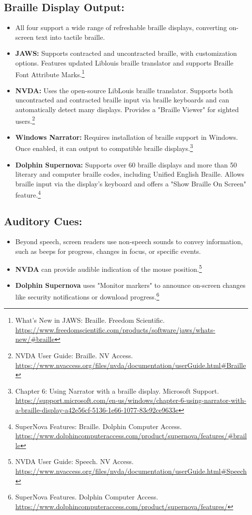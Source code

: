 \subsection*{Braille Display Output:}
\begin{itemize}[leftmargin=*,noitemsep,topsep=0pt]
    \item All four support a wide range of refreshable braille displays, converting on-screen text into tactile braille.
    \item \textbf{JAWS:} Supports contracted and uncontracted braille, with customization options. Features updated Liblouis braille translator and supports Braille Font Attribute Marks.\footnote{What's New in JAWS: Braille. Freedom Scientific. \url{https://www.freedomscientific.com/products/software/jaws/whats-new/#braille}}
    \item \textbf{NVDA:} Uses the open-source LibLouis braille translator. Supports both uncontracted and contracted braille input via braille keyboards and can automatically detect many displays. Provides a "Braille Viewer" for sighted users.\footnote{NVDA User Guide: Braille. NV Access. \url{https://www.nvaccess.org/files/nvda/documentation/userGuide.html#Braille}}
    \item \textbf{Windows Narrator:} Requires installation of braille support in Windows. Once enabled, it can output to compatible braille displays.\footnote{Chapter 6: Using Narrator with a braille display. Microsoft Support. \url{https://support.microsoft.com/en-us/windows/chapter-6-using-narrator-with-a-braille-display-a42e56cf-5136-1e66-1077-83c92ce9633e}}
    \item \textbf{Dolphin Supernova:} Supports over 60 braille displays and more than 50 literary and computer braille codes, including Unified English Braille. Allows braille input via the display's keyboard and offers a "Show Braille On Screen" feature.\footnote{SuperNova Features: Braille. Dolphin Computer Access. \url{https://www.dolphincomputeraccess.com/product/supernova/features/#braille}}
\end{itemize}

\subsection*{Auditory Cues:}
\begin{itemize}[leftmargin=*,noitemsep,topsep=0pt]
    \item Beyond speech, screen readers use non-speech sounds to convey information, such as beeps for progress, changes in focus, or specific events.
    \item \textbf{NVDA} can provide audible indication of the mouse position.\footnote{NVDA User Guide: Speech. NV Access. \url{https://www.nvaccess.org/files/nvda/documentation/userGuide.html#Speech}}
    \item \textbf{Dolphin Supernova} uses "Monitor markers" to announce on-screen changes like security notifications or download progress.\footnote{SuperNova Features. Dolphin Computer Access. \url{https://www.dolphincomputeraccess.com/product/supernova/features/}}
\end{itemize}

